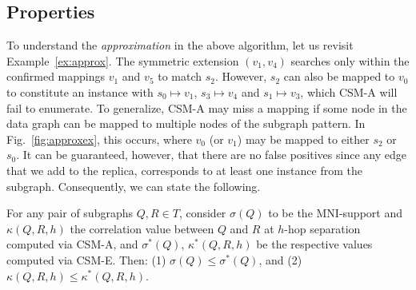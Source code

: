 \subsection{Properties} 
To understand the \emph{approximation} in the above algorithm, let us revisit
Example~\ref{ex:approx}. %
The symmetric extension $(v_1,v_4)$ searches only within the confirmed mappings
$v_1$ and $v_5$ to match $s_2$. However, $s_2$ can also be mapped to $v_0$ to constitute an instance with $s_0\mapsto v_1$, $s_3\mapsto v_4$ and $s_1\mapsto v_3$, %
 which CSM-A will fail to enumerate. To
generalize, CSM-A may miss a mapping if some node in the data graph can be
mapped to multiple nodes of the subgraph pattern. In Fig.~\ref{fig:approxex},
this occurs, where $v_0$ (or $v_1$) may be mapped to either $s_2$ or $s_0$. It
can be guaranteed, however, that there are no false positives since any edge
that we add to the replica, corresponds to at least one instance from the
subgraph. Consequently, we can state the following.

\begin{lma}
	\label{lem:lowerbound}
	For any pair of subgraphs $Q,R\in T$, consider $\sigma(Q)$ to be the {\sf
	MNI-support} and $\kappa(Q,R,h)$ the correlation value between $Q$ and $R$
	at $h$-hop separation computed via \textsc{CSM-A}, and $\sigma^*(Q)$,
	$\kappa^*(Q,R,h)$ be the respective values computed via \textsc{CSM-E}. Then:
	(1) $\sigma(Q)\leq \sigma^*(Q)$, and (2) $\kappa(Q,R,h) \leq \kappa^*(Q,R,h)$.
\end{lma}


